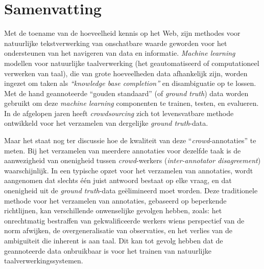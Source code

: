 \manualmark
{}

\chapter*{Samenvatting}
Met de toename van de hoeveelheid kennis op het Web, zijn methodes voor natuurlijke tekstverwerking van onschatbare waarde geworden voor het ondersteunen van het navigeren van data en informatie. 
\emph{Machine learning} modellen voor natuurlijke taalverwerking (het geautomatiseerd of computationeel verwerken van taal), die van grote hoeveelheden data afhankelijk zijn, worden ingezet om taken als \emph{``knowledge base completion''} en disambiguatie op te lossen. 
Met de hand geannoteerde ``gouden standaard'' (of \emph{ground truth}) data worden gebruikt om deze \emph{machine learning} componenten te trainen, testen, en evalueren. 
In de afgelopen jaren heeft \emph{crowdsourcing} zich tot levensvatbare methode ontwikkeld voor het verzamelen van dergelijke \emph{ground truth}-data. 

Maar het staat nog ter discussie hoe de kwaliteit van deze ``\emph{crowd}-annotaties'' te meten. 
Bij het verzamelen van meerdere annotaties voor dezelfde taak is de aanwezigheid van onenigheid tussen \emph{crowd}-werkers (\emph{inter-annotator disagreement}) waarschijnlijk. 
In een typische opzet voor het verzamelen van annotaties, wordt aangenomen dat slechts één juist antwoord bestaat op elke vraag, en dat onenigheid uit de \emph{ground truth}-data geëlimineerd moet worden. 
Deze traditionele methode voor het verzamelen van annotaties, gebaseerd op beperkende richtlijnen, kan verschillende onwenselijke gevolgen hebben, zoals: 
het onrechtmatig bestraffen van gekwalificeerde werkers wiens perspectief van de norm afwijken, 
de overgeneralisatie van observaties, en 
het verlies van de ambiguïteit die inherent is aan taal. 
Dit kan tot gevolg hebben dat de geannoteerde data onbruikbaar is voor het trainen van natuurlijke taalverwerkingssystemen. 

